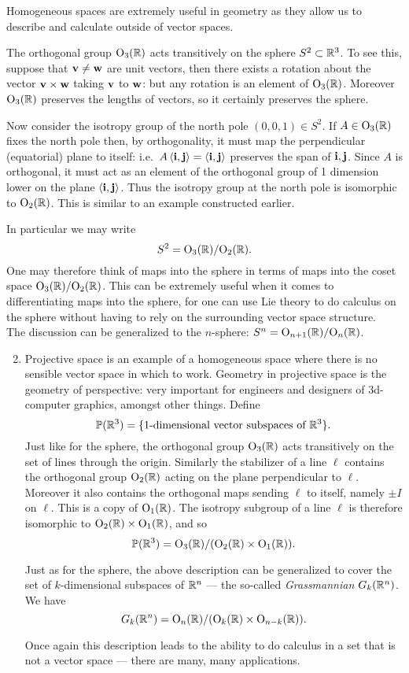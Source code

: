 Homogeneous spaces are extremely useful in geometry as they allow us to describe and calculate outside of vector spaces.

\begin{examples}{}{}
\exstart The orthogonal group $\mathrm{O}_3(\mathbb{R})$ acts transitively on the sphere $S^2\subset\mathbb{R}^3$. To see this, suppose that $\mathbf{v}\neq\mathbf{w}$ are unit vectors, then there exists a rotation about the vector $\mathbf{v}\times\mathbf{w}$ taking $\mathbf{v}$ to $\mathbf{w}$: but any rotation is an element of $\mathrm{O}_3(\mathbb{R})$. Moreover $\mathrm{O}_3(\mathbb{R})$ preserves the lengths of vectors, so it certainly preserves the sphere.

Now consider the isotropy group of the north pole $(0,0,1)\in S^2$. If $A\in\mathrm{O}_3(\mathbb{R})$ fixes the north pole then, by orthogonality, it must map the perpendicular (equatorial) plane to itself: i.e.\ $A\left\langle \mathbf{i},\mathbf{j}\right\rangle=\left\langle \mathbf{i},\mathbf{j}\right\rangle$ preserves the span of $\mathbf{i},\mathbf{j}$. Since $A$ is orthogonal, it must act as an element of the orthogonal group of 1 dimension lower on the plane $\left\langle \mathbf{i},\mathbf{j}\right\rangle$. Thus the isotropy group at the north pole is isomorphic to $\mathrm{O}_2(\mathbb{R})$. This is similar to an example constructed earlier.

In particular we may write
\[S^2=\mathrm{O}_3(\mathbb{R})/\mathrm{O}_2(\mathbb{R}).\]
One may therefore think of maps into the sphere in terms of maps into the coset space $\mathrm{O}_3(\mathbb{R})/\mathrm{O}_2(\mathbb{R})$. This can be extremely useful when it comes to differentiating maps into the sphere, for one can use Lie theory to do calculus on the sphere without having to rely on the surrounding vector space structure.\\

The discussion can be generalized to the $n$-sphere: $S^n=\mathrm{O}_{n+1}(\mathbb{R})/\mathrm{O}_n(\mathbb{R})$.
\begin{enumerate}\setcounter{enumi}{1}
\item Projective space is an example of a homogeneous space where there is no sensible vector space in which to work. Geometry in projective space is the geometry of perspective: very important for engineers and designers of 3d-computer graphics, amongst other things. Define
\[\mathbb{P}(\mathbb{R}^3)=\{\text{1-dimensional vector subspaces of }\mathbb{R}^3\}.\]
Just like for the sphere, the orthogonal group $\mathrm{O}_3(\mathbb{R})$ acts transitively on the set of lines through the origin. Similarly the stabilizer of a line $\ell$ contains the orthogonal group $\mathrm{O}_2(\mathbb{R})$ acting on the plane perpendicular to $\ell$. Moreover it also contains the orthogonal maps sending $\ell$ to itself, namely $\pm I$ on $\ell$. This is a copy of $\mathrm{O}_1(\mathbb{R})$. The isotropy subgroup of a line $\ell$ is therefore isomorphic to $\mathrm{O}_2(\mathbb{R})\times\mathrm{O}_1(\mathbb{R})$, and so
\[\mathbb{P}(\mathbb{R}^3)=\mathrm{O}_3(\mathbb{R})/(\mathrm{O}_2(\mathbb{R})\times\mathrm{O}_1(\mathbb{R})).\]

Just as for the sphere, the above description can be generalized to cover the set of $k$-dimensional subspaces of $\mathbb{R}^n$ --- the so-called \emph{Grassmannian} $G_k(\mathbb{R}^n)$. We have
\[G_k(\mathbb{R}^n)=\mathrm{O}_n(\mathbb{R})/(\mathrm{O}_k(\mathbb{R})\times\mathrm{O}_{n-k}(\mathbb{R})).\]

Once again this description leads to the ability to do calculus in a set that is not a vector space --- there are many, many applications.
\end{enumerate}
\end{examples}

\fi